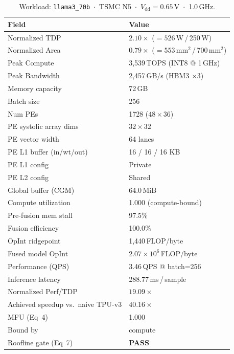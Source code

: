 \begin{table}[h]
\centering
\caption{Workload: \texttt{llama3\_70b}~$\cdot$~TSMC N5~$\cdot$~$V_\text{dd}=0.65$\,V~$\cdot$~1.0\,GHz.}
\label{tab:cheetah_v2_llama3_70b}
\small\setlength{\tabcolsep}{6pt}
\begin{tabular}{@{}ll@{}}
\toprule
\textbf{Field} & \textbf{Value} \\
\midrule
Normalized TDP          & $2.10\times$ ($= 526$\,W\,/\,250\,W) \\
Normalized Area         & $0.79\times$ ($= 553$\,mm$^2$\,/\,700\,mm$^2$) \\
Peak Compute            & 3{,}539\,TOPS (INT8 @ 1\,GHz) \\
Peak Bandwidth          & 2{,}457\,GB/s (HBM3 $\times$3) \\
Memory capacity         & 72\,GB \\
Batch size              & 256 \\
Num PEs                 & 1728 ($48 \times 36$) \\
PE systolic array dims  & $32 \times 32$ \\
PE vector width         & 64 lanes \\
PE L1 buffer (in/wt/out) & 16 / 16 / 16 KB \\
PE L1 config            & Private \\
PE L2 config            & Shared \\
Global buffer (CGM)     & 64.0\,MiB \\
\midrule
Compute utilization     & 1.000 (compute-bound) \\
Pre-fusion mem stall    & 97.5\% \\
Fusion efficiency       & 100.0\% \\
OpInt ridgepoint        & 1{,}440\,FLOP/byte \\
Fused model OpInt       & $2.07 \times 10^{6}$\,FLOP/byte \\
Performance (QPS)       & 3.46\,QPS @ batch=256 \\
Inference latency       & 288.77\,ms\,/\,sample \\
Normalized Perf/TDP     & $19.09\times$ \\
Achieved speedup vs.\ naive TPU-v3 & $40.16\times$ \\
MFU (Eq~4)              & 1.000 \\
Bound by                & compute \\
Roofline gate (Eq~7)    & \textcolor{green!60!black}{\textbf{PASS}} \\

\end{tabular}
\end{table}
